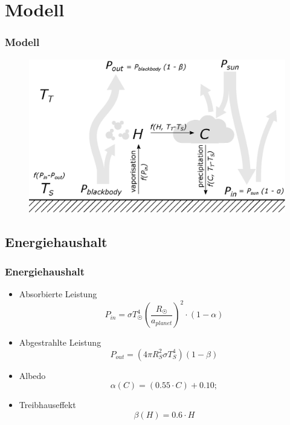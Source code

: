 \documentclass{beamer}
\begin{document}
\section{Modell} 
\begin{frame}
	\frametitle{Modell}
	\begin{figure}
		\includegraphics[width=\linewidth]{Model.eps}
	\end{figure}
\end{frame}

\subsection{Energiehaushalt}
\begin{frame}
\frametitle{Energiehaushalt}
\begin{itemize}
	\item[] Absorbierte Leistung
	\begin{equation}
	P_{in} = \sigma T_{\astrosun}^4 \left( \frac{R_{\astrosun}}{a_{planet}} \right) ^2 \cdot (1-\alpha)
	\end{equation}
	\pause
	
	\item[] Abgestrahlte Leistung
	\begin{equation}
	P_{out} = (4 \pi R_{S}^2 \sigma T_{S}^4)(1 - \beta)
	\end{equation}
	\pause
	
	\item[] Albedo
	\begin{equation}
	\alpha(C) = (0.55 \cdot C) + 0.10;
	\end{equation}
	\pause
	
	\item[] Treibhauseffekt
	\begin{equation}
	\beta(H) = 0.6 \cdot H
	\end{equation}
\end{itemize}
\end{frame}
\end{document}
